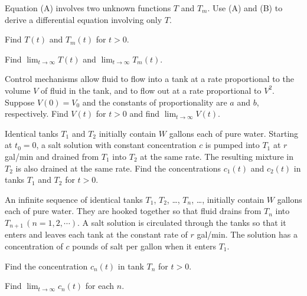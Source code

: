 \begin{exerciselist}
  \begin{alist}
    \item %
    Equation (A) involves two unknown functions $T$ and $T_{m}$. Use (A) and (B) to derive a
    differential equation involving only $T$.

    \item %
    Find $T(t)$ and $T_{m}(t)$ for $t>0$.

    \item %
    Find $\lim_{t\to\infty}T(t)$ and $\lim_{t\to\infty}T_{m}(t)$.
  \end{alist}

  \item\label{exer:4.2.18} Control mechanisms allow fluid to flow into a tank at a rate proportional
        to the volume $V$ of fluid in the tank, and to flow out at a rate proportional to $V^{2}$.
        Suppose $V(0)=V_{0}$ and the constants of proportionality are $a$ and $b$, respectively.
        Find $V(t)$ for $t>0$ and find $\lim_{t\to\infty}V(t)$.

  \item\label{exer:4.2.19} Identical tanks $T_{1}$ and $T_{2}$ initially contain $W$ gallons each of
        pure water. Starting at $t_{0}=0$, a salt solution with constant concentration $c$ is pumped
        into $T_{1}$ at $r$ gal/min and drained from $T_{1}$ into $T_{2}$ at the same rate. The
        resulting mixture in $T_{2}$ is also drained at the same rate. Find the concentrations
        $c_{1}(t)$ and $c_{2}(t)$ in tanks $T_{1}$ and $T_{2}$ for $t>0$.

  \item\label{exer:4.2.20} An infinite sequence of identical tanks $T_{1}$, $T_{2}$, \dots, $T_{n}$,
        \dots, initially contain $W$ gallons each of pure water. They are hooked together so that
        fluid drains from $T_{n}$ into $T_{n+1}\,(n=1,2,\cdots)$. A salt solution is circulated
        through the tanks so that it enters and leaves each tank at the constant rate of $r$
        gal/min. The solution has a concentration of $c$ pounds of salt per gallon when it enters
        $T_{1}$.

  \begin{alist}
    \item %
    Find the concentration $c_{n}(t)$ in tank $T_{n}$ for $t>0$.

    \item %
    Find $\lim_{t\to\infty}c_{n}(t)$ for each $n$.
  \end{alist}


\end{exerciselist}
